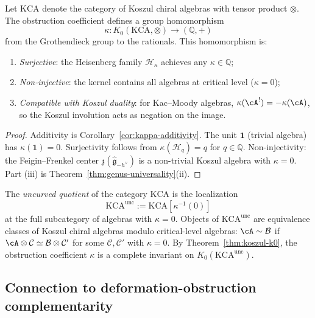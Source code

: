 \begin{theorem}
\label{thm:koszul-k0}
Let $\mathrm{KCA}$ denote the category of Koszul chiral algebras with tensor product $\otimes$.  The obstruction coefficient defines a group homomorphism
\[
\kappa: K_0(\mathrm{KCA}, \otimes) \to (\mathbb{Q}, +)
\]
from the Grothendieck group to the rationals.  This homomorphism is:
\begin{enumerate}[label=\textup{(\roman*)}]
\item \emph{Surjective}: the Heisenberg family $\mathcal{H}_\kappa$ achieves any $\kappa \in \mathbb{Q}$;
\item \emph{Non-injective}: the kernel contains all algebras at critical level ($\kappa = 0$);
\item \emph{Compatible with Koszul duality}: for Kac--Moody algebras, $\kappa(\cA^!) = -\kappa(\cA)$, so the Koszul involution acts as negation on the image.
\end{enumerate}
\end{theorem}

\begin{proof}
Additivity is Corollary~\ref{cor:kappa-additivity}.  The unit $\mathbf{1}$ (trivial algebra) has $\kappa(\mathbf{1}) = 0$.  Surjectivity follows from $\kappa(\mathcal{H}_q) = q$ for $q \in \mathbb{Q}$.  Non-injectivity: the Feigin--Frenkel center $\mathfrak{z}(\widehat{\mathfrak{g}}_{-h^\vee})$ is a non-trivial Koszul algebra with $\kappa = 0$.  Part (iii) is Theorem~\ref{thm:genus-universality}(ii).
\end{proof}

\begin{definition}\label{def:uncurved-quotient}
The \emph{uncurved quotient} of the category $\mathrm{KCA}$ is the localization
\[
\mathrm{KCA}^{\mathrm{unc}} := \mathrm{KCA}[\kappa^{-1}(0)]
\]
at the full subcategory of algebras with $\kappa = 0$.  Objects of $\mathrm{KCA}^{\mathrm{unc}}$ are equivalence classes of Koszul chiral algebras modulo critical-level algebras: $\cA \sim \mathcal{B}$ if $\cA \otimes \mathcal{C} \simeq \mathcal{B} \otimes \mathcal{C}'$ for some $\mathcal{C}, \mathcal{C}'$ with $\kappa = 0$.  By Theorem~\ref{thm:koszul-k0}, the obstruction coefficient $\kappa$ is a complete invariant on $K_0(\mathrm{KCA}^{\mathrm{unc}})$.
\end{definition}

\subsection{Connection to deformation-obstruction complementarity}
\label{subsec:obstruction-deformation-connection}

